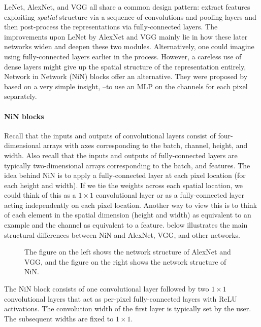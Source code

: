 \label{cnn:nin}

LeNet, AlexNet, and VGG all share a common design pattern: extract features exploiting \textit{spatial} structure via a sequence of convolutions and pooling layers and then post-process the representations via fully-connected layers. The improvements upon LeNet by AlexNet and VGG mainly lie in how these later networks widen and deepen these two modules. Alternatively, one could imagine using fully-connected layers earlier in the process. However, a careless use of dense layers might give up the spatial structure of the representation entirely, Network in Network (NiN) blocks offer an alternative. They were proposed by \citet{Lin2014nin} based on a very simple insight, --to use an MLP on the channels for each pixel separately.

\paragraph{NiN blocks}

Recall that the inputs and outputs of convolutional layers consist of four-dimensional arrays with axes corresponding to the batch, channel, height, and width. Also recall that the inputs and outputs of fully-connected layers are typically two-dimensional arrays corresponding to the batch, and features. The idea behind NiN is to apply a fully-connected layer at each pixel location (for each height and  width). If we tie the weights across each spatial location, we could think of this as a $1\times 1$ convolutional layer or as a fully-connected layer acting independently on each pixel location. Another way to view this is to think of each element in the spatial dimension (height and width) as equivalent to an example and the channel as equivalent to a feature.  below illustrates the main structural differences between NiN and AlexNet, VGG, and other networks.

\begin{figure}[hpt]
	\centering
	
	\caption{The figure on the left shows the network structure of AlexNet and VGG, and the figure on the right shows the network structure of NiN.}
	\label{fig:nin-compare}
\end{figure}

The NiN block consists of one convolutional layer followed by two $1\times 1$ convolutional layers that act as per-pixel fully-connected layers with ReLU activations. The convolution width of the first layer is typically set by the user. The subsequent widths are fixed to $1 \times 1$.

